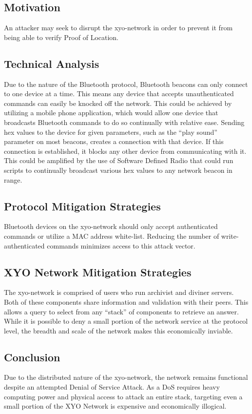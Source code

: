 \documentclass{article}
\begin{document}
\subsection{Motivation}

An attacker may seek to disrupt the \Gls{xyo-network} in order to prevent it from being able to verify Proof of Location.

\subsection{Technical Analysis}

Due to the nature of the Bluetooth protocol, Bluetooth beacons can only connect to one device at a time. This means any device that accepts unauthenticated commands can easily be knocked off the network. This could be achieved by utilizing a mobile phone application, which would allow one device that broadcasts Bluetooth commands to do so continually with relative ease. Sending hex values to the device for given parameters, such as the ``play sound'' parameter on most beacons, creates a connection with that device. If this connection is established, it blocks any other device from communicating with it. This could be amplified by the use of Software Defined Radio that could run scripts to continually broadcast various hex values to any network beacon in range. 

\subsection{Protocol Mitigation Strategies}
Bluetooth devices on the \Gls{xyo-network} should only accept authenticated commands or utilize a MAC address white-list. Reducing the number of write-authenticated commands minimizes access to this attack vector. 

\subsection{XYO Network Mitigation Strategies}
The \Gls{xyo-network} is comprised of users who run \Gls{archivist} and \Gls{diviner} servers. Both of these components share information and validation with their peers. This allows a query to select from any ``stack'' of components to retrieve an answer. While it is possible to deny a small portion of the network service at the protocol level, the breadth and scale of the network makes this economically inviable. 

\subsection{Conclusion}
Due to the distributed nature of the \Gls{xyo-network}, the network remains functional despite an attempted Denial of Service Attack. As a DoS requires heavy computing power and physical access to attack an entire stack, targeting even a small portion of the XYO Network is expensive and economically illogical.
\end{document}
